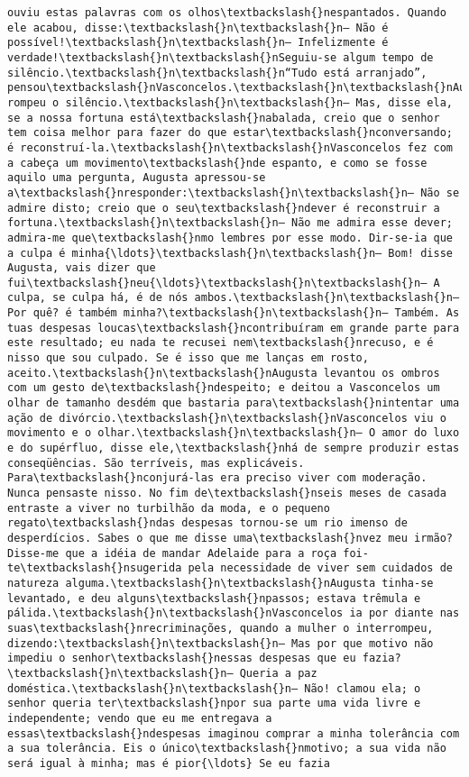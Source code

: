 \begin{Verbatim}[commandchars=\\\{\}]
ouviu estas palavras com os olhos\textbackslash{}nespantados. Quando ele acabou, disse:\textbackslash{}n\textbackslash{}n— Não é possível!\textbackslash{}n\textbackslash{}n— Infelizmente é verdade!\textbackslash{}n\textbackslash{}nSeguiu-se algum tempo de silêncio.\textbackslash{}n\textbackslash{}n“Tudo está arranjado”, pensou\textbackslash{}nVasconcelos.\textbackslash{}n\textbackslash{}nAugusta rompeu o silêncio.\textbackslash{}n\textbackslash{}n— Mas, disse ela, se a nossa fortuna está\textbackslash{}nabalada, creio que o senhor tem coisa melhor para fazer do que estar\textbackslash{}nconversando; é reconstruí-la.\textbackslash{}n\textbackslash{}nVasconcelos fez com a cabeça um movimento\textbackslash{}nde espanto, e como se fosse aquilo uma pergunta, Augusta apressou-se a\textbackslash{}nresponder:\textbackslash{}n\textbackslash{}n— Não se admire disto; creio que o seu\textbackslash{}ndever é reconstruir a fortuna.\textbackslash{}n\textbackslash{}n— Não me admira esse dever; admira-me que\textbackslash{}nmo lembres por esse modo. Dir-se-ia que a culpa é minha{\ldots}\textbackslash{}n\textbackslash{}n— Bom! disse Augusta, vais dizer que fui\textbackslash{}neu{\ldots}\textbackslash{}n\textbackslash{}n— A culpa, se culpa há, é de nós ambos.\textbackslash{}n\textbackslash{}n— Por quê? é também minha?\textbackslash{}n\textbackslash{}n— Também. As tuas despesas loucas\textbackslash{}ncontribuíram em grande parte para este resultado; eu nada te recusei nem\textbackslash{}nrecuso, e é nisso que sou culpado. Se é isso que me lanças em rosto, aceito.\textbackslash{}n\textbackslash{}nAugusta levantou os ombros com um gesto de\textbackslash{}ndespeito; e deitou a Vasconcelos um olhar de tamanho desdém que bastaria para\textbackslash{}nintentar uma ação de divórcio.\textbackslash{}n\textbackslash{}nVasconcelos viu o movimento e o olhar.\textbackslash{}n\textbackslash{}n— O amor do luxo e do supérfluo, disse ele,\textbackslash{}nhá de sempre produzir estas conseqüências. São terríveis, mas explicáveis. Para\textbackslash{}nconjurá-las era preciso viver com moderação. Nunca pensaste nisso. No fim de\textbackslash{}nseis meses de casada entraste a viver no turbilhão da moda, e o pequeno regato\textbackslash{}ndas despesas tornou-se um rio imenso de desperdícios. Sabes o que me disse uma\textbackslash{}nvez meu irmão? Disse-me que a idéia de mandar Adelaide para a roça foi-te\textbackslash{}nsugerida pela necessidade de viver sem cuidados de natureza alguma.\textbackslash{}n\textbackslash{}nAugusta tinha-se levantado, e deu alguns\textbackslash{}npassos; estava trêmula e pálida.\textbackslash{}n\textbackslash{}nVasconcelos ia por diante nas suas\textbackslash{}nrecriminações, quando a mulher o interrompeu, dizendo:\textbackslash{}n\textbackslash{}n— Mas por que motivo não impediu o senhor\textbackslash{}nessas despesas que eu fazia?\textbackslash{}n\textbackslash{}n— Queria a paz doméstica.\textbackslash{}n\textbackslash{}n— Não! clamou ela; o senhor queria ter\textbackslash{}npor sua parte uma vida livre e independente; vendo que eu me entregava a essas\textbackslash{}ndespesas imaginou comprar a minha tolerância com a sua tolerância. Eis o único\textbackslash{}nmotivo; a sua vida não será igual à minha; mas é pior{\ldots} Se eu fazia 
\end{Verbatim}
